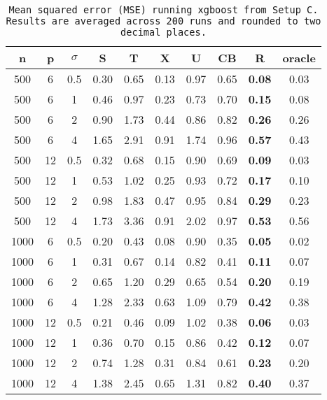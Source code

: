 \begin{table}[ht]
\centering
\begin{tabular}{cccccccccc}
  \hline
n & p & $\sigma$ & S & T & X & U & CB & R & oracle \\ 
  \hline
500 & 6 & 0.5 & 0.30 & 0.65 & 0.13 & 0.97 & 0.65 & \bf 0.08 & 0.03 \\ 
  500 & 6 & 1 & 0.46 & 0.97 & 0.23 & 0.73 & 0.70 & \bf 0.15 & 0.08 \\ 
  500 & 6 & 2 & 0.90 & 1.73 & 0.44 & 0.86 & 0.82 & \bf 0.26 & 0.26 \\ 
  500 & 6 & 4 & 1.65 & 2.91 & 0.91 & 1.74 & 0.96 & \bf 0.57 & 0.43 \\ 
  500 & 12 & 0.5 & 0.32 & 0.68 & 0.15 & 0.90 & 0.69 & \bf 0.09 & 0.03 \\ 
  500 & 12 & 1 & 0.53 & 1.02 & 0.25 & 0.93 & 0.72 & \bf 0.17 & 0.10 \\ 
  500 & 12 & 2 & 0.98 & 1.83 & 0.47 & 0.95 & 0.84 & \bf 0.29 & 0.23 \\ 
  500 & 12 & 4 & 1.73 & 3.36 & 0.91 & 2.02 & 0.97 & \bf 0.53 & 0.56 \\ 
  1000 & 6 & 0.5 & 0.20 & 0.43 & 0.08 & 0.90 & 0.35 & \bf 0.05 & 0.02 \\ 
  1000 & 6 & 1 & 0.31 & 0.67 & 0.14 & 0.82 & 0.41 & \bf 0.11 & 0.07 \\ 
  1000 & 6 & 2 & 0.65 & 1.20 & 0.29 & 0.65 & 0.54 & \bf 0.20 & 0.19 \\ 
  1000 & 6 & 4 & 1.28 & 2.33 & 0.63 & 1.09 & 0.79 & \bf 0.42 & 0.38 \\ 
  1000 & 12 & 0.5 & 0.21 & 0.46 & 0.09 & 1.02 & 0.38 & \bf 0.06 & 0.03 \\ 
  1000 & 12 & 1 & 0.36 & 0.70 & 0.15 & 0.86 & 0.42 & \bf 0.12 & 0.07 \\ 
  1000 & 12 & 2 & 0.74 & 1.28 & 0.31 & 0.84 & 0.61 & \bf 0.23 & 0.20 \\ 
  1000 & 12 & 4 & 1.38 & 2.45 & 0.65 & 1.31 & 0.82 & \bf 0.40 & 0.37 \\ 
   \hline
\end{tabular}
\caption{\tt Mean squared error (MSE) running \texttt{xgboost} from Setup C. Results are averaged across 200 runs and rounded to two decimal places.} 
\label{table:setup3}
\end{table}
